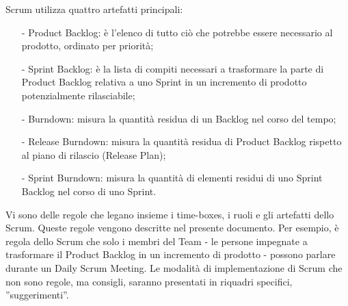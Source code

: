 Scrum  utilizza  quattro artefatti principali:\begin{itemize}
\item[-] Product Backlog: \`e l'elenco di tutto ci\`o che potrebbe essere necessario al prodotto, ordinato per priorit\`a;
\item[-] Sprint Backlog: \`e la lista di compiti necessari a trasformare la parte di Product Backlog relativa a uno Sprint in
un incremento di prodotto potenzialmente rilasciabile;
\item[-] Burndown:  misura la quantit\`a residua di un Backlog nel corso del tempo;
\item[-] Release Burndown: misura la quantit\`a residua di Product Backlog rispetto al piano di rilascio (Release Plan);
\item[-] Sprint Burndown: misura la quantit\`a  di elementi residui di uno Sprint Backlog
nel corso  di uno  Sprint.
\end{itemize}

Vi sono delle regole che legano insieme i time-boxes, i ruoli e gli artefatti dello Scrum. Queste regole vengono descritte nel presente documento.
Per  esempio, \`e regola  dello Scrum che solo  i membri  del Team   -  le persone
impegnate a  trasformare il Product Backlog  in un  incremento  di prodotto -  possono
parlare durante un Daily Scrum Meeting. Le  modalit\`a di implementazione di  Scrum che non sono regole, ma consigli, saranno presentati in riquadri specifici, ''suggerimenti''.
\vspace{0.4cm}


